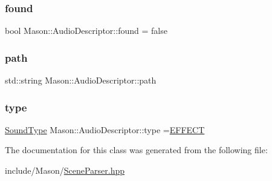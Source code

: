 \subsubsection{\texorpdfstring{found}{found}}
{\footnotesize\ttfamily bool Mason\+::\+Audio\+Descriptor\+::found = false}

\hypertarget{class_mason_1_1_audio_descriptor_a48908da92ad467deffccb4d8340aea20}{}\label{class_mason_1_1_audio_descriptor_a48908da92ad467deffccb4d8340aea20} 
\subsubsection{\texorpdfstring{path}{path}}
{\footnotesize\ttfamily std\+::string Mason\+::\+Audio\+Descriptor\+::path}

\hypertarget{class_mason_1_1_audio_descriptor_af0235fd20741197930246f28acb5113b}{}\label{class_mason_1_1_audio_descriptor_af0235fd20741197930246f28acb5113b} 
\subsubsection{\texorpdfstring{type}{type}}
{\footnotesize\ttfamily \hyperlink{namespace_mason_a158d651086d1ba1aacc4c37125b27657}{Sound\+Type} Mason\+::\+Audio\+Descriptor\+::type =\hyperlink{namespace_mason_a158d651086d1ba1aacc4c37125b27657a3ee843ce73fc06de504eb1480c65c82f}{E\+F\+F\+E\+CT}}



The documentation for this class was generated from the following file\+:\begin{DoxyCompactItemize}
\item 
include/\+Mason/\hyperlink{_scene_parser_8hpp}{Scene\+Parser.\+hpp}\end{DoxyCompactItemize}
